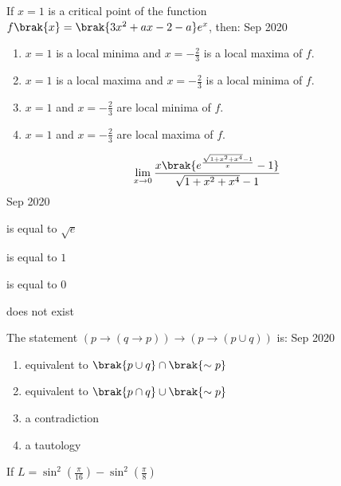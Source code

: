 \iffalse
  \title{Assignment 4}
  \author{AI24BTECH11014}
  \section{mcq-single}
\fi


\item If $x=1$ is a critical point of the function $f\brak{x} = \brak{3x^{2}+ax-2-a}e^{x}$, then: 
	\hfill{Sep 2020} 
\begin{enumerate}                            
\item $x=1$ is a local minima and $x = -\frac{2}{3}$ is a local maxima of $f$.          
\item $x=1$ is a local maxima and $x=-\frac{2}{3}$ is a local minima of $f$.            
\item $x=1$ and $x=-\frac{2}{3}$ are local minima of $f$.           
\item $x=1$ and $x=-\frac{2}{3}$ are local maxima of $f$.       
\end{enumerate}
\item
	  \begin{align}
		  \lim_{x \to 0}\frac{x\brak{{e}^{\frac{\sqrt{1+x^{2}+x^{4}} - 1}{x}} -1 }}{\sqrt{1+x^{2}+x^{4}} - 1}
	  \end{align}
		\hfill{Sep 2020}
\begin{enumerate}
  \begin{multicols}{4}
  \item  is equal to $\sqrt{e}$
  \item is equal to $1$
  \item is equal to $0$
  \item does not exist
  \end{multicols}
  \end{enumerate}
 \item The statement $(p \rightarrow (q \rightarrow p)) \rightarrow (p \rightarrow (p \cup q))$ is:
	 \hfill{Sep 2020}
  \begin{enumerate}
 \item equivalent to $\brak{p \cup q} \cap \brak{ \sim p}$       
 \item equivalent to $\brak{p \cap q} \cup \brak{ \sim p}$      
 \item a contradiction
  \item a tautology
  \end{enumerate}
  \item If $L = \sin^2\left(\frac{\pi}{16}\right) - \sin^2\left(\frac{\pi}{8}\right)$
